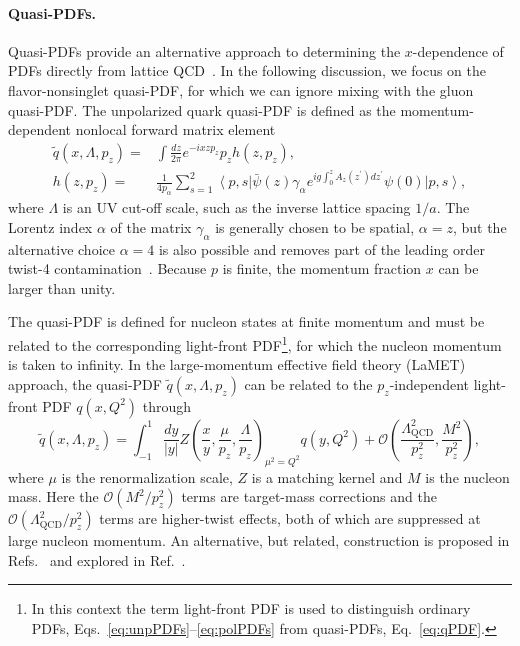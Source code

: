 \paragraph*{Quasi-PDFs.}
Quasi-PDFs provide an alternative approach to determining the $x$-dependence 
of PDFs directly from lattice QCD~\cite{Ji:2013dva,Ji:2014gla}. 
%
In the following discussion, we focus on the flavor-nonsinglet quasi-PDF, 
for which we can ignore mixing with the gluon quasi-PDF. 
%
The unpolarized quark quasi-PDF is defined as the momentum-dependent
nonlocal forward matrix element
\begin{align}\label{eq:qPDF}
\widetilde{q}(x,\Lambda,p_z)  
= {} &  \int \frac{dz}{2\pi} e^{-i x z p_z} p_z h(z,p_z), \nonumber \\
h(z,p_z) 
= {} &
\frac{1}{4 p_{\alpha}}\sum_{s=1}^2\left\langle p,s\right\vert \bar{\psi}(z)\gamma_\alpha e^{ig\int_0^z
A_z(z^\prime) dz^\prime} \psi(0) \left\vert p,s\right\rangle,
\end{align}
%
where $\Lambda$ is an UV cut-off scale, such as the inverse lattice spacing 
$1/a$. 
%
The Lorentz index $\alpha$ of the matrix $\gamma_\alpha$ is generally chosen 
to be spatial, $\alpha = z$, but the alternative choice $\alpha = 4$ is also 
possible and removes part of the leading order twist-4 
contamination~\cite{Xiong:2013bka,Radyushkin:2016hsy}. 
%
Because $p$ is finite, the momentum fraction $x$ can be larger than unity.

The quasi-PDF is defined for nucleon states at finite momentum and must be 
related to the corresponding light-front PDF\footnote{In this context the term 
 light-front PDF is used to distinguish ordinary PDFs, 
 Eqs.~\eqref{eq:unpPDFs}--\eqref{eq:polPDFs} from quasi-PDFs, 
 Eq.~\eqref{eq:qPDF}.}, 
for which the nucleon momentum is taken to infinity.
%
In the  large-momentum  effective field theory (LaMET) approach, the
quasi-PDF $\widetilde{q}(x,\Lambda,p_z)$ can be related to the $p_z$-independent
light-front PDF $q(x,Q^2)$ through~\cite{Ji:2013dva,Ji:2014gla}
\begin{equation} \label{eq:qPDFmatching}
\widetilde{q}(x,\Lambda ,p_z) = 
  \int_{-1}^1 \frac{dy}{\left\vert y\right\vert} 
    Z\left( \frac{x}{y}, \frac{\mu}{p_z}, \frac{\Lambda}{p_z}\right)_{\mu^2 = Q^2} q(y,Q^2) +
  \mathcal{O}\left( \frac{\Lambda_\text{QCD}^2}{p_z^2},\frac{M^2}{p_z^2}\right), 
\end{equation}
where $\mu$ is the renormalization scale,
$Z$ is a matching kernel and $M$ is the nucleon mass.
%
Here the $\mathcal{O}\left(M^2/p_z^2\right)$ terms are target-mass corrections 
and the $\mathcal{O}\left(\Lambda_\text{QCD}^2/p_z^2\right)$ terms are 
higher-twist effects, both of which are suppressed at large nucleon momentum. 
%
%
An alternative, but related, construction is proposed in 
Refs.~\cite{Radyushkin:2016hsy,Radyushkin:2017cyf} and explored in 
Ref.~\cite{Orginos:2017kos}.

